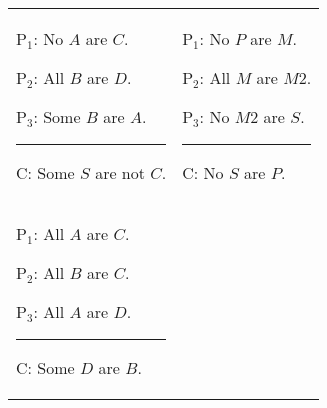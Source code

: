 {\begin{exercises}
\begin{longtabu}{X[1,p,m]X[1,p,m]} 
\item \begin{earg}
\item[P$_1$:] No $A$ are $C$.
\item[P$_2$:] All $B$ are $D$.
\item[P$_3$:] Some $B$ are $A$.
\vspace{-.5em}
\item [] \rule{0.6\linewidth}{.5pt} 
\item[C:] Some $S$ are not $C$.
\end{earg} 
%
%
&
\item\begin{earg}
\item[P$_1$:] No $P$ are $M$.
\item[P$_2$:] All $M$ are $M2$.
\item[P$_3$:] No $M2$ are $S$.
\vspace{-.5em}
\item [] \rule{0.6\linewidth}{.5pt} 
\item[C:] No $S$ are $P$.
\end{earg}
%
%
\\
\item\begin{earg}
\item[P$_1$:] All $A$ are $C$.
\item[P$_2$:] All $B$ are $C$.
\item[P$_3$:] All $A$ are $D$.
\vspace{-.5em}
\item [] \rule{0.6\linewidth}{.5pt} 
\item[C:] Some $D$ are $B$.
\end{earg}



\end{longtabu}
\end{exercises}}
